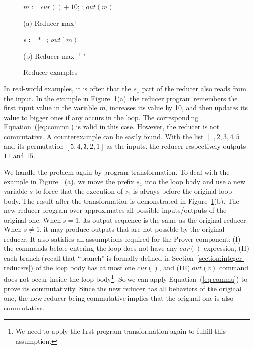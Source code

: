 \documentclass{llncs}
\newcommand{\cur}{cur()}
\begin{document}
\begin{figure}[t]
	\begin{minipage}{0.4\textwidth}
		\begin{algorithm}[H]
			\;\;$m := \cur + 10$; \;
			\Loop{}{
				$t:=\cur$\;
				\uIf{ $t> m$}{
					$m := t$ \;
				}
			};
			$out(m)$\;\;
		\end{algorithm}
		\caption*{(a) Reducer max$^+$}
	\end{minipage}
		\begin{minipage}{0.6\textwidth}
			\begin{algorithm}[H]
				$s:=*;$\;
				\Loop{}{
					\uIf{$s=1$}{$m := \cur + 10; s:= 2$}
					\uElse{
						$t:=\cur$\;
						\uIf{ $t > m$}{
							$m := t$ \;
						}
					}
				};
				$out(m)$
			\end{algorithm}
			\caption*{(b) Reducer max$^{+\mathtt{fix}}$}
		\end{minipage}
	\caption{Reducer examples}
	\label{fig:reducer_max}
\end{figure}





In real-world examples, it is often that the $s_1$ part of the reducer also reads from the input. In the example in Figure~\ref{fig:reducer_max}(a), the reducer program remembers the first input value in the variable $m$, increases its value by 10, and then updates its value to bigger ones if any occurs in the loop. The corresponding Equation~(\ref{eq:commu}) is valid in this case. However, the reducer is not commutative. A counterexample can be easily found. With the list $[1,2,3,4,5]$ and its permutation $[5,4,3,2,1]$ as the inputs, the reducer respectively outputs $11$ and $15$.

We handle the problem again by program transformation. To deal with the example in Figure~\ref{fig:reducer_max}(a), we move the prefix $s_1$ into the loop body and use a new variable $s$ to force that the execution of $s_1$ is always before the original loop body. The result after the transformation is demonstrated in Figure~\ref{fig:reducer_max}(b). The new reducer program over-approximates all possible inputs/outputs of the original one. When $s=1$, its output sequence is the same as the original reducer. When $s\neq 1$, it may produce outputs that are not possible by the original reducer.
It also satisfies all assumptions required for the Prover component:
(I) the commands before entering the loop does not have any $\cur$ expression,
(II) each branch (recall that ``branch'' is formally defined in Section~\ref{section:integer-reducers}) of the loop body has at most one $\cur$, and
(III) $out(v)$ command does not occur inside the loop body\footnote{We need to apply the first program transformation again to fulfill this assumption.}. So we can apply Equation~(\ref{eq:commu}) to prove its commutativity.
Since the new reducer has all behaviors of the original one, the new reducer being commutative implies that the original one is also commutative.
\end{document}
